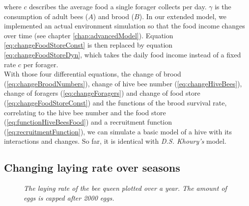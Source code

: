 	where $c$ describes the average food a single forager collects per day. $\gamma$ is the consumption of adult bees ($A$) and brood ($B$). In our extended model, we implemented an actual environment simulation so that the food income changes over time (see chapter \ref{chap:advancedModel}). Equation \ref{eq:changeFoodStoreConst} is then replaced by equation \ref{eq:changeFoodStoreDyn}, which takes the daily food income instead of a fixed rate $c$ per forager.\\	
	With those four differential equations, the change of brood (\ref{eq:changeBroodNumbers}), change of hive bee number (\ref{eq:changeHiveBees}), change of foragers (\ref{eq:changeForagers}) and change of food store (\ref{eq:changeFoodStoreConst}) and the functions of the brood survival rate, correlating to the hive bee number and the food store (\ref{eq:functionHiveBeesFood}) and a recruitment function (\ref{eq:recruitmentFunction}), we can simulate a basic model of a hive with its interactions and changes. So far, it is identical with \textit{D.S. Khoury's} model.

	\subsection{Changing laying rate over seasons}
		\begin{figure}[H]
			\centering
			\caption{\textit{The laying rate of the bee queen plotted over a year. The amount of eggs is capped after 2000 eggs. }}
			\label{fig:dynLayingRate}
		\end{figure}
		
